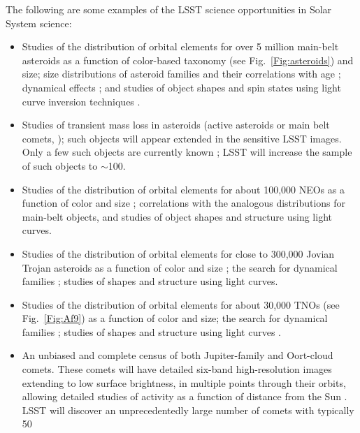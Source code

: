 The following are some examples of the LSST science opportunities in
Solar System science:
\begin{itemize}
\item Studies of the distribution of orbital elements for over 5 million main-belt
asteroids as a function of color-based taxonomy (see Fig.~\ref{Fig:asteroids})
and size; size distributions of asteroid families \citep{2008Icar..198..138P} and their
correlations with age \citep{2004Natur.429..275J,2005Icar..173..132N}; dynamical
effects \citep{2001Sci...294.1693B}; and studies of object shapes and spin states using
light curve inversion techniques \citep{2000Icar..148...12P,2009A&A...493..291D}.
\item Studies of transient mass loss in asteroids (active asteroids or main belt comets,
\citealt{2006Sci...312..561H}); such objects will appear extended in the
sensitive LSST images. Only a few such objects are currently known
\citep{2011AJ....142...28J,2012AJ....143...66J};
LSST
will increase the sample of such objects to $\sim$100.
\item Studies of the distribution of orbital elements for about 100,000 NEOs as a
function of color and size \citep{1993ApJ...407..412R,2003Icar..163..363D};
correlations with the analogous distributions for
main-belt objects, and studies of object shapes and structure using light curves.
\item Studies of the distribution of orbital elements for close to 300,000 Jovian Trojan
asteroids as a function of color and size \citep{2000AJ....120.1140J,2005AJ....130.2900Y,2007MNRAS.377.1393S};
the search for dynamical families
\citep{2005HiA....13..758K}; studies of shapes and structure using light curves.
\item Studies of the distribution of orbital elements for about 30,000 TNOs (see
Fig.~\ref{Fig:Af9}) as a function of color and size; the search for dynamical families
\citep{2011ApJ...733...40M}; studies of shapes and structure using light curves
\citep{1995AJ....110.3073D,2001AJ....122..457T,2001AJ....122.1051G,2004AJ....128.1364B,2005AJ....129.1117E,2006Icar..185..508J,2007AJ....134.2186D}.
\item An unbiased and complete census of both Jupiter-family and Oort-cloud
comets. These comets will have detailed six-band high-resolution
images extending to low surface brightness, in multiple points through
their orbits, allowing detailed studies of activity as a function of
distance from the Sun \citep{1999A&A...349..649L,2004come.book...17A}.
LSST will
discover an unprecedentedly large number of comets with typically 50

\end{itemize}

